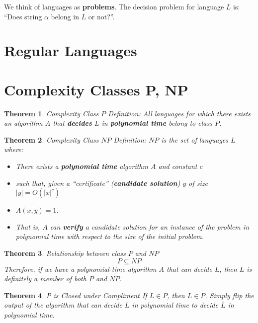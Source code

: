 \documentclass[a4paper,12pt]{report}
\newtheorem{theorem}{Theorem}
\begin{document}
We think of languages as \textbf{problems}. The decision problem for language $L$ is: ``Does string $\alpha$ belong in $L$ or not?''.


\section{Regular Languages}

\section{Complexity Classes P, NP}

\begin{theorem}{Complexity Class $P$ Definition: }
All languages for which there exists an algorithm $A$ that \textbf{decides} $L$ in \textbf{polynomial time} belong to class $P$.
\end{theorem}


\begin{theorem}{Complexity Class $NP$ Definition: }
$NP$ is the set of languages $L$ where: 
\begin{itemize}
\item There exists a \textbf{polynomial time} algorithm $A$ and constant $c$
\item such that, given a ``certificate'' (\textbf{candidate solution}) $y$ of size $|y| = O(|x|^c)$
\item $A(x,y) = 1$. 
\item That is, $A$ can \textbf{verify} a candidate solution for an instance of the problem in polynomial time with respect to the size of the initial problem. 
\end{itemize}
\end{theorem}


\begin{theorem}{Relationship between class $P$ and $NP$}
\begin{equation}
P\subseteq NP
\end{equation}
Therefore, if we have a polynomial-time algorithm $A$ that can decide $L$, then $L$ is definitely a member of both $P$ and $NP$. 
\end{theorem}


\begin{theorem}{P is Closed under Compliment}
If $L\in P$, then $\bar L \in P$. Simply flip the output of the algorithm that can decide $L$ in polynomial time to decide $\bar L$ in polynomial time. 
\end{theorem}
\end{document}
